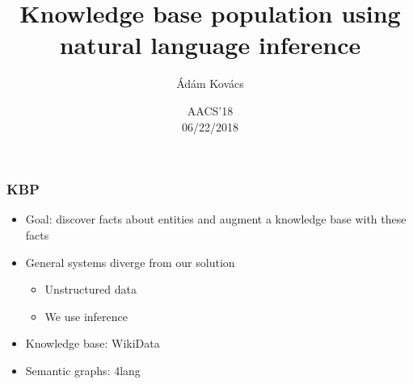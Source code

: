 \documentclass[bigger]{beamer}
\begin{document}
\title{Knowledge base population using natural language inference}
\author{\'Ad\'am Kov\'acs}

\date{AACS'18\\
06/22/2018}


\begin{frame} 

\titlepage 

\end{frame} 


\begin{frame} 

    \frametitle{KBP \citep{HengJi:2011}} 
    \begin{itemize}
        \pause \item Goal: discover facts about entities and augment a knowledge base with these facts
        \pause \item General systems diverge from our solution
        \begin{itemize}
            \pause \item Unstructured data
            \pause \item We use inference
        \end{itemize}
        \pause \item Knowledge base: WikiData
        \pause \item Semantic graphs: 4lang
    \end{itemize}

\end{frame} 

\end{document}
